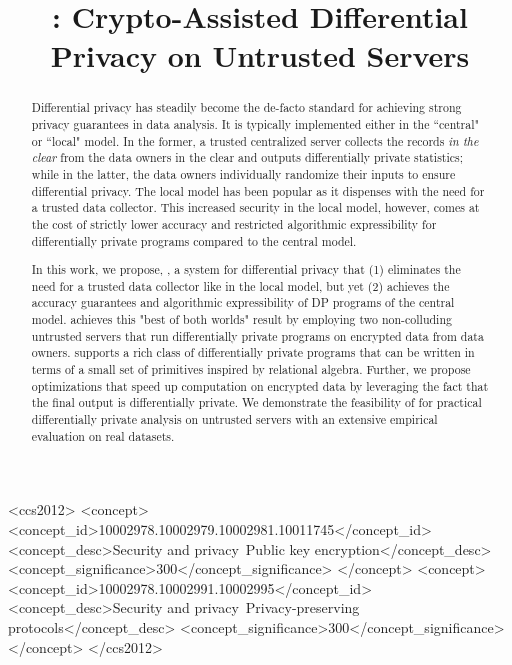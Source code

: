 \documentclass[sigconf]{acmart}
\begin{document}
\title{\system: Crypto-Assisted Differential Privacy on Untrusted Servers}
\author{}
\begin{abstract}
Differential privacy has steadily become the de-facto standard for achieving strong privacy guarantees in data analysis. It is typically implemented either in the ``central" or ``local" model. In the former, a trusted centralized server collects the records \textit{in the clear} from the data owners in the clear and outputs differentially private statistics; while in the latter, the data owners individually randomize their inputs to ensure differential privacy.  The local model has been popular as it dispenses with the need for a trusted data collector. This increased security in the local model, however, comes at the cost of strictly lower accuracy and restricted algorithmic expressibility for differentially private programs compared to the central model. 

In this work, we propose, \system, a  system for differential privacy that (1) eliminates the need for a trusted data collector like in the local model, but yet (2) achieves the accuracy guarantees and algorithmic expressibility of DP programs of the central model. \system achieves this "best of both worlds" result by employing two non-colluding untrusted servers that run differentially private programs on encrypted data from data owners. \system 
supports a rich class of differentially private programs that can be written in terms of a small set of primitives inspired by relational algebra. Further, we propose optimizations that speed up computation on encrypted data by leveraging the fact that the final output is differentially private. We demonstrate the feasibility of \system for practical differentially private analysis on untrusted servers with an extensive empirical evaluation on real datasets.
\end{abstract}
\begin{CCSXML}
<ccs2012>
<concept>
<concept_id>10002978.10002979.10002981.10011745</concept_id>
<concept_desc>Security and privacy~Public key encryption</concept_desc>
<concept_significance>300</concept_significance>
</concept>
<concept>
<concept_id>10002978.10002991.10002995</concept_id>
<concept_desc>Security and privacy~Privacy-preserving protocols</concept_desc>
<concept_significance>300</concept_significance>
</concept>
</ccs2012>
\end{CCSXML}
\end{document}

